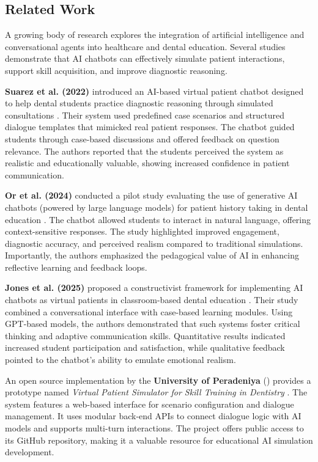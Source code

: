 \documentclass[runningheads,a4paper,11pt]{report}
\begin{document}
\subsection{Related Work}

A growing body of research explores the integration of artificial intelligence and conversational agents into healthcare and dental education. Several studies demonstrate that AI chatbots can effectively simulate patient interactions, support skill acquisition, and improve diagnostic reasoning.

\textbf{Suarez et al. (2022)} introduced an AI-based virtual patient chatbot designed to help dental students practice diagnostic reasoning through simulated consultations \cite{suarez2022}. Their system used predefined case scenarios and structured dialogue templates that mimicked real patient responses. The chatbot guided students through case-based discussions and offered feedback on question relevance. The authors reported that the students perceived the system as realistic and educationally valuable, showing increased confidence in patient communication.

\textbf{Or et al. (2024)} conducted a pilot study evaluating the use of generative AI chatbots (powered by large language models) for patient history taking in dental education \cite{or2024}. The chatbot allowed students to interact in natural language, offering context-sensitive responses. The study highlighted improved engagement, diagnostic accuracy, and perceived realism compared to traditional simulations. Importantly, the authors emphasized the pedagogical value of AI in enhancing reflective learning and feedback loops.

\textbf{Jones et al. (2025)} proposed a constructivist framework for implementing AI chatbots as virtual patients in classroom-based dental education \cite{jones2025}. Their study combined a conversational interface with case-based learning modules. Using GPT-based models, the authors demonstrated that such systems foster critical thinking and adaptive communication skills. Quantitative results indicated increased student participation and satisfaction, while qualitative feedback pointed to the chatbot’s ability to emulate emotional realism.

An open source implementation by the \textbf{University of Peradeniya} (\citeauthor{cepdnaclk2022}) provides a prototype named \emph{Virtual Patient Simulator for Skill Training in Dentistry} \cite{cepdnaclk2022}. The system features a web-based interface for scenario configuration and dialogue management. It uses modular back-end APIs to connect dialogue logic with AI models and supports multi-turn interactions. The project offers public access to its GitHub repository, making it a valuable resource for educational AI simulation development.
\end{document}
